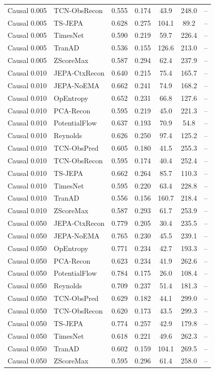 \begin{table}[t]
\begin{tabular}{@{}llccccc@{}}
Causal 0.005 & TCN-ObsRecon & 0.555 & 0.174 & 43.9 & 248.0 & -- \\
Causal 0.005 & TS-JEPA & 0.628 & 0.275 & 104.1 & 89.2 & -- \\
Causal 0.005 & TimesNet & 0.590 & 0.219 & 59.7 & 226.4 & -- \\
Causal 0.005 & TranAD & 0.536 & 0.155 & 126.6 & 213.0 & -- \\
Causal 0.005 & ZScoreMax & 0.587 & 0.294 & 62.4 & 237.9 & -- \\
Causal 0.010 & JEPA-CtxRecon & 0.640 & 0.215 & 75.4 & 165.7 & -- \\
Causal 0.010 & JEPA-NoEMA & 0.662 & 0.241 & 74.9 & 168.2 & -- \\
Causal 0.010 & OpEntropy & 0.652 & 0.231 & 66.8 & 127.6 & -- \\
Causal 0.010 & PCA-Recon & 0.595 & 0.219 & 45.0 & 221.3 & -- \\
Causal 0.010 & PotentialFlow & 0.637 & 0.193 & 70.9 & 54.8 & -- \\
Causal 0.010 & Reynolds & 0.626 & 0.250 & 97.4 & 125.2 & -- \\
Causal 0.010 & TCN-ObsPred & 0.605 & 0.180 & 41.5 & 255.3 & -- \\
Causal 0.010 & TCN-ObsRecon & 0.595 & 0.174 & 40.4 & 252.4 & -- \\
Causal 0.010 & TS-JEPA & 0.662 & 0.264 & 85.7 & 110.3 & -- \\
Causal 0.010 & TimesNet & 0.595 & 0.220 & 63.4 & 228.8 & -- \\
Causal 0.010 & TranAD & 0.556 & 0.156 & 160.7 & 218.4 & -- \\
Causal 0.010 & ZScoreMax & 0.587 & 0.293 & 61.7 & 253.9 & -- \\
Causal 0.050 & JEPA-CtxRecon & 0.779 & 0.205 & 30.4 & 235.5 & -- \\
Causal 0.050 & JEPA-NoEMA & 0.765 & 0.230 & 45.5 & 239.1 & -- \\
Causal 0.050 & OpEntropy & 0.771 & 0.234 & 42.7 & 193.3 & -- \\
Causal 0.050 & PCA-Recon & 0.623 & 0.234 & 41.9 & 262.6 & -- \\
Causal 0.050 & PotentialFlow & 0.784 & 0.175 & 26.0 & 108.4 & -- \\
Causal 0.050 & Reynolds & 0.709 & 0.237 & 51.4 & 181.3 & -- \\
Causal 0.050 & TCN-ObsPred & 0.629 & 0.182 & 44.1 & 299.0 & -- \\
Causal 0.050 & TCN-ObsRecon & 0.620 & 0.173 & 43.5 & 299.3 & -- \\
Causal 0.050 & TS-JEPA & 0.774 & 0.257 & 42.9 & 179.8 & -- \\
Causal 0.050 & TimesNet & 0.618 & 0.221 & 49.6 & 262.3 & -- \\
Causal 0.050 & TranAD & 0.602 & 0.159 & 104.1 & 269.5 & -- \\
Causal 0.050 & ZScoreMax & 0.595 & 0.296 & 61.4 & 258.0 & -- \\
\bottomrule
\end{tabular}
\end{table}


